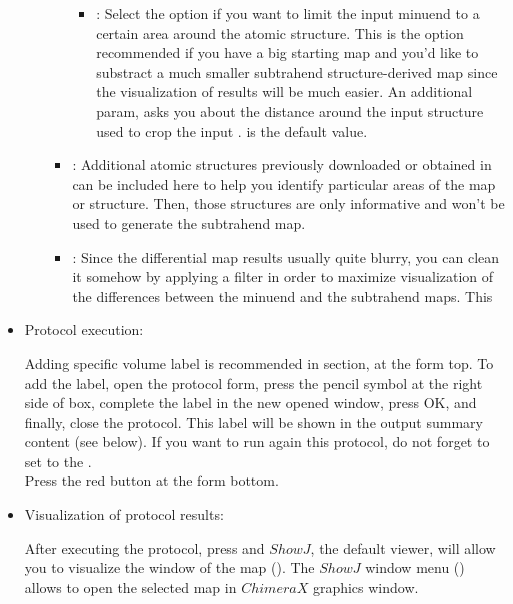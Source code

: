 \begin{itemize}
\begin{itemize}
\begin{itemize}
\begin{itemize}
            \item {}: Select the option  if you want to limit the input minuend  to a certain area around the atomic structure. This is the option recommended if you have a big starting map and you'd like to substract a much smaller subtrahend structure-derived map since the visualization of results will be much easier. An additional param,  asks you about the distance around the input structure used to crop the input .  is the default value.
            \end{itemize}
    \item {}: Additional atomic structures previously downloaded or obtained in \scipion can be included here to help you identify particular areas of the map or structure. Then, those structures are only informative and won't be used to generate the subtrahend map.
    \item {}: Since the differential map results usually quite blurry, you can clean it somehow by applying a filter in order to maximize visualization of the differences between the minuend and the subtrahend maps. This 
    \end{itemize}
   \end{itemize}
   
  
  \item Protocol execution:
  
  Adding specific volume label is recommended in  section, at the form top. To add the label, open the protocol form, press the pencil symbol at the right side of  box, complete the label in the new opened window, press OK, and finally, close the protocol. This label will be shown in the output summary content (see below). If you want to run again this protocol, do not forget to set to  the .\\
  Press the  red button at the form bottom.
  
  \item Visualization of protocol results:
  
  After executing the protocol, press  and $ShowJ$, the default \scipion viewer, will allow you to visualize the  window of the map  (). The $ShowJ$ window menu () allows to open the selected map in $ChimeraX$ graphics window.
   

\end{itemize}
